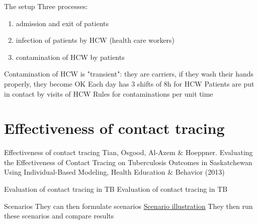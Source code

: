 \documentclass[aspectratio=169]{beamer}\usepackage[]{graphicx}\usepackage[]{xcolor}
\begin{document}
\begin{frame}{The setup}
\bbullet Three processes:
\begin{enumerate}
  \item admission and exit of patients
  \item infection of patients by HCW (health care workers)
  \item contamination of HCW by patients
\end{enumerate}
\bbullet Contamination of HCW is "transient": they are carriers, if they wash their hands properly, they become OK
\bbullet Each day has 3 shifts of 8h for HCW
\bbullet Patients are put in contact by visits of HCW
\bbullet Rules for contaminations per unit time
\end{frame}



\section{Effectiveness of contact tracing}
\begin{frame}{Effectiveness of contact tracing}
\bbullet Tian, Osgood, Al-Azem \& Hoeppner. Evaluating the Effectiveness of Contact Tracing on Tuberculosis Outcomes in Saskatchewan Using Individual-Based Modeling, Health Education \& Behavior (2013)
\end{frame}

\begin{frame}{Evaluation of contact tracing in TB}
\bbullet Evaluation of contact tracing in TB
\end{frame}




\begin{frame}{Scenarios}
\bbullet They can then formulate scenarios
\href{https://raw.githubusercontent.com/julien-arino/3MC-course-epidemiological-modelling/main/FIGS/TianOsgood_etal_scenarios.jpeg}{Scenario illustration}
\bbullet They then run these scenarios and compare results
\end{frame}

\end{document}
